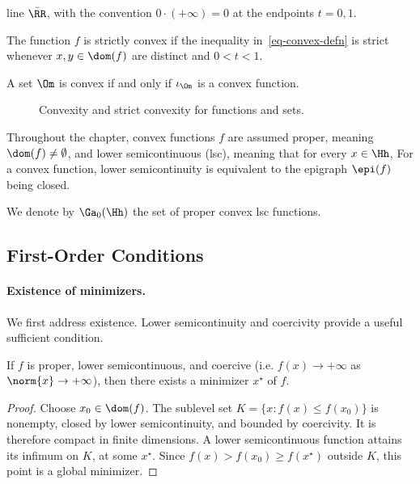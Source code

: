  line $\bar\RR$, with the convention $0\cdot(+\infty)=0$ at the endpoints $t=0,1$.
 
The function $f$ is strictly convex if the inequality in~\eqref{eq-convex-defn} is strict whenever $x,y\in\dom(f)$ are distinct and $0<t<1$.
 
A set $\Om$ is convex if and only if $\iota_{\Om}$ is a convex function.



\begin{figure}[tbp]
\centering
{}
\caption{Convexity and strict convexity for functions and sets.}
\label{fig-convex-examples}
\end{figure}




Throughout the chapter, convex functions $f$ are assumed proper, meaning $\dom(f) \neq \emptyset$, and lower semicontinuous (lsc), meaning that for every $x \in \Hh$,
For a convex function, lower semicontinuity is equivalent to the epigraph $\epi(f)$ being closed.
 
We denote by $\Ga_0(\Hh)$ the set of proper convex lsc functions.

                                                                                  
\subsection{First-Order Conditions}

   
\paragraph{Existence of minimizers.}

We first address existence. Lower semicontinuity and coercivity provide a useful sufficient condition.

\begin{prop}
	If $f$ is proper, lower semicontinuous, and coercive (i.e. $f(x)\rightarrow +\infty$ as $\norm{x}\rightarrow +\infty$), then there exists a minimizer $x^\star$ of $f$.
\end{prop}

\begin{proof}
Choose $x_0\in\dom(f)$. The sublevel set $K=\{x:f(x)\leq f(x_0)\}$ is nonempty, closed by lower semicontinuity, and bounded by coercivity. It is therefore compact in finite dimensions. A lower semicontinuous function attains its infimum on $K$, at some $x^\star$. Since $f(x)>f(x_0)\geq f(x^\star)$ outside $K$, this point is a global minimizer.
\end{proof}

